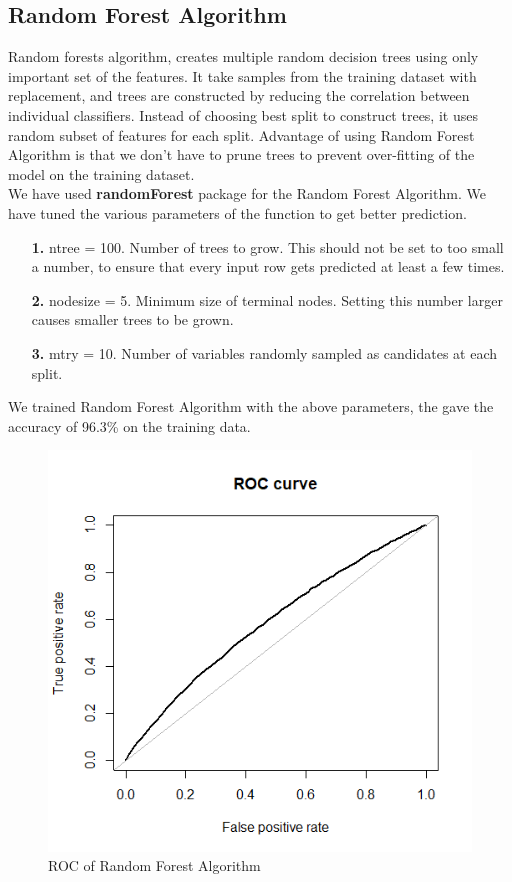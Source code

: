 \documentclass[fleqn,10pt]{SelfArx} %
\begin{document}
\subsection{Random Forest Algorithm}
Random forests algorithm, creates multiple random decision trees using only important set of the features. It take samples from the training dataset with replacement, and trees are constructed by reducing the correlation between individual classifiers. Instead of choosing best split to construct trees, it uses random subset of features for each split. Advantage of using Random Forest Algorithm is that we don't have to prune trees to prevent over-fitting of the model on the training dataset.\\
We have used \textbf{randomForest} package for the Random Forest Algorithm. We have tuned the various parameters of the function to get better prediction.
\begin{enumerate}
\item[\textbf{1.}] ntree = 100. Number of trees to grow. This should not be set to too small a number, to ensure that every input row gets predicted at least a few times.\\
\item[\textbf{2.}] nodesize = 5. Minimum size of terminal nodes. Setting this number larger causes smaller trees to be grown.\\ 
\item[\textbf{3.}] mtry = 10. Number of variables randomly sampled as candidates at each split.\\
\end{enumerate}
We trained Random Forest Algorithm with the above parameters, the gave the accuracy of 96.3\% on the training data.\\

\begin{figure}[h]
	\includegraphics[width=0.8\columnwidth]{plots/ROC_random_forest.png}\centering
	\caption{ROC of Random Forest Algorithm}
	\end{figure}
	
\end{document}
